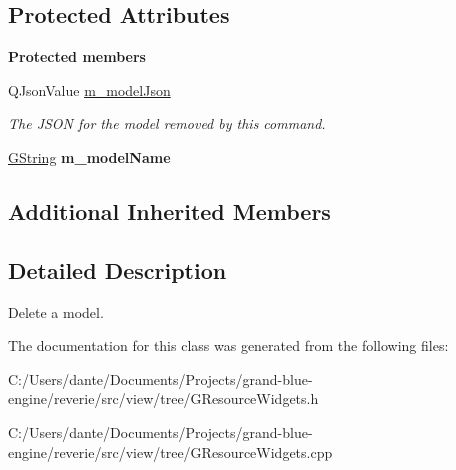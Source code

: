 \subsection*{Protected Attributes}
\begin{Indent}\textbf{ Protected members}\par
\begin{DoxyCompactItemize}
\item 
\mbox{\label{classrev_1_1_delete_model_command_adc9540fb8fcd7954523a09fda3b73691}} 
Q\+Json\+Value \mbox{\hyperlink{classrev_1_1_delete_model_command_adc9540fb8fcd7954523a09fda3b73691}{m\+\_\+model\+Json}}
\begin{DoxyCompactList}\small\item\em The J\+S\+ON for the model removed by this command. \end{DoxyCompactList}\item 
\mbox{\label{classrev_1_1_delete_model_command_a8f34477113f1490bd6d49795284f0601}} 
\mbox{\hyperlink{classrev_1_1_g_string}{G\+String}} {\bfseries m\+\_\+model\+Name}
\end{DoxyCompactItemize}
\end{Indent}
\subsection*{Additional Inherited Members}


\subsection{Detailed Description}
Delete a model. 

The documentation for this class was generated from the following files\+:\begin{DoxyCompactItemize}
\item 
C\+:/\+Users/dante/\+Documents/\+Projects/grand-\/blue-\/engine/reverie/src/view/tree/G\+Resource\+Widgets.\+h\item 
C\+:/\+Users/dante/\+Documents/\+Projects/grand-\/blue-\/engine/reverie/src/view/tree/G\+Resource\+Widgets.\+cpp\end{DoxyCompactItemize}
